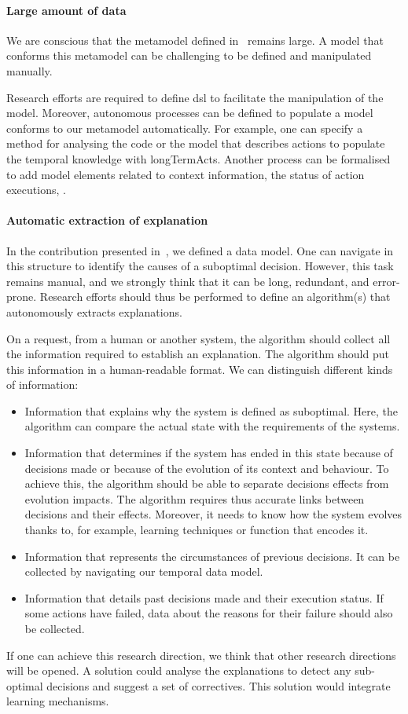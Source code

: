 \paragraph{Large amount of data}
We are conscious that the \gls{metamodel} defined in~ remains large.
A \gls{model} that conforms this \gls{metamodel} can be challenging to be defined and manipulated manually.

Research efforts are required to define \gls{dsl} to facilitate the manipulation of the \gls{model}.
Moreover, autonomous processes can be defined to populate a \gls{model} conforms to our \gls{metamodel} automatically.
For example, one can specify a method for analysing the code or the model that describes \glspl{action} to populate the temporal knowledge with \glspl{longTermAct}.
Another process can be formalised to add \gls{model} elements related to context information, the status of action executions, \etc{}.

\paragraph{Automatic extraction of explanation}
In the contribution presented in~, we defined a data model.
One can navigate in this structure to identify the causes of a suboptimal decision.
However, this task remains manual, and we strongly think that it can be long, redundant, and error-prone.
Research efforts should thus be performed to define an algorithm(s) that autonomously extracts explanations.

On a request, from a human or another system, the algorithm should collect all the information required to establish an explanation.
The algorithm should put this information in a human-readable format.
We can distinguish different kinds of information:
\begin{itemize}
	\item Information that explains why the system is defined as suboptimal. Here, the algorithm can compare the actual state  with the requirements of the systems.
	\item Information that determines if the system has ended in this state because of decisions made or because of the evolution of its context and behaviour. To achieve this, the algorithm should be able to separate decisions effects from evolution impacts. The algorithm requires thus accurate links between decisions and their effects. Moreover, it needs to know how the system evolves thanks to, for example, learning techniques or function that encodes it.
	\item Information that represents the circumstances of previous decisions. It can be collected by navigating our temporal data model.
	\item Information that details past decisions made and their execution status. If some actions have failed, data about the reasons for their failure should also be collected.
\end{itemize}

If one can achieve this research direction, we think that other research directions will be opened.
A solution could analyse the explanations to detect any sub-optimal decisions and suggest a set of correctives.
This solution would integrate learning mechanisms.





